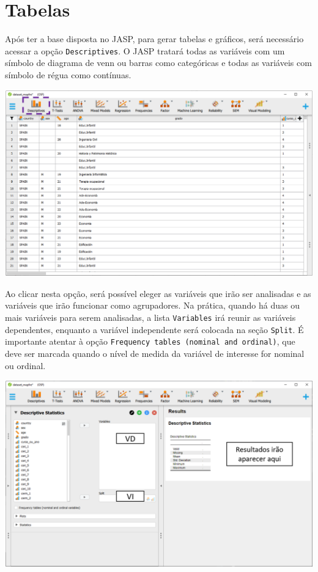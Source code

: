 \documentclass[
]{book}
\begin{document}
\hypertarget{tabelas-1}{%
\section{Tabelas}\label{tabelas-1}}

Após ter a base disposta no JASP, para gerar tabelas e gráficos, será necessário acessar a opção \texttt{Descriptives}. O JASP tratará todas as variáveis com um símbolo de diagrama de venn ou barras como categóricas e todas as variáveis com símbolo de régua como contínuas.

\includegraphics{./img/cap_desc_jasp_descritivo.png}

Ao clicar nesta opção, será possível eleger as variáveis que irão ser analisadas e as variáveis que irão funcionar como agrupadores. Na prática, quando há duas ou mais variáveis para serem analisadas, a lista \texttt{Variables} irá reunir as variáveis dependentes, enquanto a variável independente será colocada na seção \texttt{Split}. É importante atentar à opção \texttt{Frequency\ tables\ (nominal\ and\ ordinal)}, que deve ser marcada quando o nível de medida da variável de interesse for nominal ou ordinal.

\includegraphics{./img/cap_desc_jasp_descritivo2.png}
\end{document}
